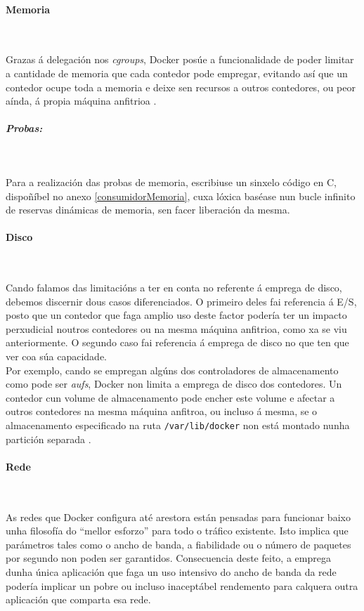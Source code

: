 \paragraph{Memoria}~

Grazas á delegación nos \textit{cgroups}, Docker posúe a funcionalidade de poder limitar a cantidade de memoria que cada contedor pode empregar, evitando así que un contedor ocupe toda a memoria e deixe sen recursos a outros contedores, ou peor aínda, á propia máquina anfitrioa \cite{state-of-art-docker-security}.

\subparagraph{Probas:}~

Para a realización das probas de memoria, escribiuse un sinxelo código en C, dispoñíbel no anexo \ref{consumidorMemoria}, cuxa lóxica baséase nun bucle infinito de reservas dinámicas de memoria, sen facer liberación da mesma.

\paragraph{Disco}~

Cando falamos das limitacións a ter en conta no referente á emprega de disco, debemos discernir dous casos diferenciados. O primeiro deles fai referencia á E/S, posto que un contedor que faga amplio uso deste factor podería ter un impacto perxudicial noutros contedores ou na mesma máquina anfitrioa, como xa se viu anteriormente. O segundo caso fai referencia á emprega de disco no que ten que ver coa súa capacidade.\\

Por exemplo, cando se empregan algúns dos controladores de almacenamento como pode ser \textit{aufs}, Docker non limita a emprega de disco dos contedores. Un contedor cun volume de almacenamento pode encher este volume e afectar a outros contedores na mesma máquina anfitroa, ou incluso á mesma, se o almacenamento especificado na ruta {\tt /var/lib/docker} non está montado nunha partición separada \cite{To-Docker-Or-Not-To-Docker}.

\paragraph{Rede}~

As redes que Docker configura até arestora están pensadas para funcionar baixo unha filosofía do ``mellor esforzo'' para todo o tráfico existente. Isto implica que parámetros tales como o ancho de banda, a fiabilidade ou o número de paquetes por segundo non poden ser garantidos. Consecuencia deste feito, a emprega dunha única aplicación que faga un uso intensivo do ancho de banda da rede podería implicar un pobre ou incluso inaceptábel rendemento para calquera outra aplicación que comparta esa rede.\\

